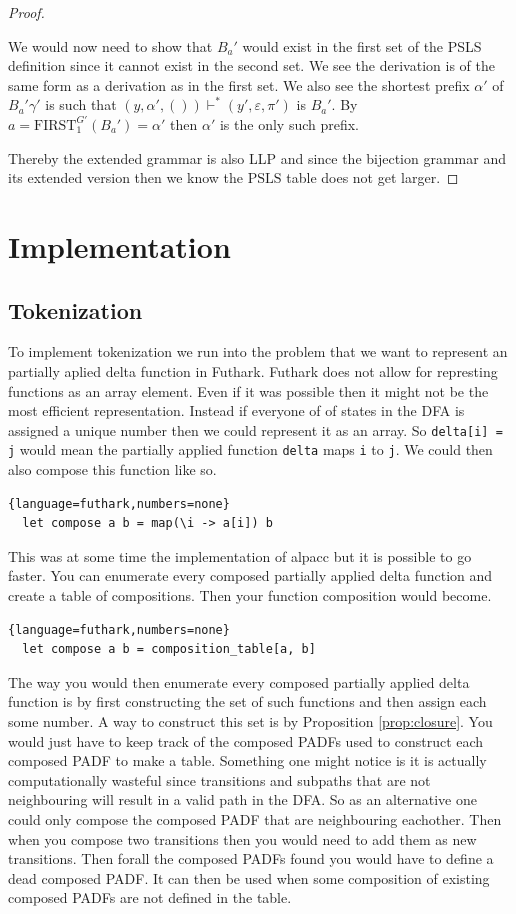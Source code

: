 \documentclass[a4paper,12pt]{article}
\newcommand\PSLS{\text{PSLS}}
\theoremstyle{definition}
\begin{document}
\begin{proof}
\begin{itemize}
    We would now need to show that $B_a'$ would exist in the first set of the PSLS definition since it cannot exist in the second set. We see the derivation is of the same form as a derivation as in the first set. We also see the shortest prefix $\alpha'$ of $B_a'\gamma'$ is such that $(y, \alpha', ()) \vdash^* (y', \varepsilon, \pi')$ is $B_a'$. By $a = \text{FIRST}^{G'}_1(B_a') = \alpha'$ then $\alpha'$ is the only such prefix.
  \end{itemize}
  Thereby the extended grammar is also LLP and since the bijection grammar and its extended version then we know the $\PSLS$ table does not get larger.
\end{proof}

\section{Implementation}
\subsection{Tokenization}
To implement tokenization we run into the problem that we want to represent an partially aplied delta function in Futhark. Futhark does not allow for represting functions as an array element. Even if it was possible then it might not be the most efficient representation. Instead if everyone of of states in the DFA is assigned a unique number then we could represent it as an array. So \texttt{delta[i] = j} would mean the partially applied function \texttt{delta} maps \texttt{i} to \texttt{j}. We could then also compose this function like so.
\begin{lstlisting}{language=futhark,numbers=none}
  let compose a b = map(\i -> a[i]) b
\end{lstlisting}
This was at some time the implementation of alpacc but it is possible to go faster. You can enumerate every composed partially applied delta function and create a table of compositions. Then your function composition would become.
\begin{lstlisting}{language=futhark,numbers=none}
  let compose a b = composition_table[a, b]
\end{lstlisting}
The way you would then enumerate every composed partially applied delta function is by first constructing the set of such functions and then assign each some number. A way to construct this set is by Proposition \ref{prop:closure}. You would just have to keep track of the composed PADFs used to construct each composed PADF to make a table. Something one might notice is it is actually computationally wasteful since transitions and subpaths that are not neighbouring will result in a valid path in the DFA. So as an alternative one could only compose the composed PADF that are neighbouring eachother. Then when you compose two transitions then you would need to add them as new transitions. Then forall the composed PADFs found you would have to define a dead composed PADF. It can then be used when some composition of existing composed PADFs are not defined in the table.
\end{document}
